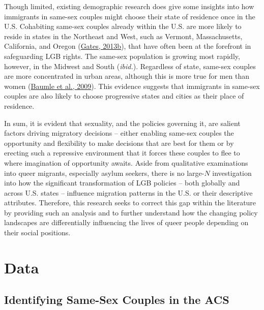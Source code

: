 \documentclass[
  11pt,
]{article}
\begin{document}
Though limited, existing demographic research does give some insights into how immigrants in same-sex couples might choose their state of residence once in the U.S. Cohabiting same-sex couples already within the U.S. are more likely to reside in states in the Northeast and West, such as Vermont, Massachusetts, California, and Oregon (\protect\hyperlink{ref-gates_2013a}{Gates, 2013b}), that have often been at the forefront in safeguarding LGB rights. The same-sex population is growing most rapidly, however, in the Midwest and South (\emph{ibid.}). Regardless of state, same-sex couples are more concentrated in urban areas, although this is more true for men than women (\protect\hyperlink{ref-baumle_2009}{Baumle et al., 2009}). This evidence suggests that immigrants in same-sex couples are also likely to choose progressive states and cities as their place of residence.

In sum, it is evident that sexuality, and the policies governing it, are salient factors driving migratory decisions -- either enabling same-sex couples the opportunity and flexibility to make decisions that are best for them or by erecting such a repressive environment that it forces these couples to flee to where imagination of opportunity awaits. Aside from qualitative examinations into queer migrants, especially asylum seekers, there is no large-\(N\) investigation into how the significant transformation of LGB policies -- both globally and across U.S. states -- influence migration patterns in the U.S. or their descriptive attributes. Therefore, this research seeks to correct this gap within the literature by providing such an analysis and to further understand how the changing policy landscapes are differentially influencing the lives of queer people depending on their social positions.

\hypertarget{data}{%
\section{Data}\label{data}}

\hypertarget{identifying-same-sex-couples-in-the-acs}{%
\subsection{Identifying Same-Sex Couples in the ACS}\label{identifying-same-sex-couples-in-the-acs}}
\end{document}
